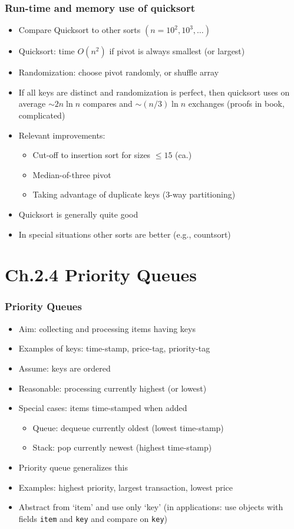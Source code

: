 \documentclass[handout]{beamer}
\begin{document}
\begin{frame}
    \frametitle{Run-time and memory use of quicksort}

\begin{itemize}[<+->]
\item Compare Quicksort to other sorts $(n=10^2, 10^3,\ldots)$
\item Quicksort: time $O(n^2)$ if pivot is always smallest (or largest)
\item Randomization: choose pivot randomly, or shuffle array
\item If all keys are distinct and randomization is perfect, then quicksort
uses on average $\sim 2n\ln n$ compares and $\sim (n/3) \ln n$
exchanges (proofs in book, complicated)
\item Relevant improvements:
  \begin{itemize}[<+->]
  \item Cut-off to insertion sort for sizes $\leq 15$ (ca.)
  \item Median-of-three pivot
  \item Taking advantage of duplicate keys (3-way partitioning)
  \end{itemize}
\item Quicksort is generally quite good
\item In special situations other sorts are better (e.g., countsort)
\end{itemize}
\end{frame}

\section{Ch.2.4 Priority Queues}

\begin{frame}
    \frametitle{Priority Queues}

\begin{itemize}[<+->]
\item Aim: collecting and processing items having keys
\item Examples of keys: time-stamp, price-tag, priority-tag
\item Assume: keys are ordered
\item Reasonable: processing currently highest (or lowest)
\item Special cases: items time-stamped when added
  \begin{itemize}[<+->]
  \item Queue: dequeue currently oldest (lowest time-stamp)
  \item Stack: pop currently newest (highest time-stamp)
  \end{itemize}
\item Priority queue generalizes this
\item Examples: highest priority, largest transaction, lowest price
\item Abstract from `item' and use only `key' (in applications:
use objects with fields {\tt item} and {\tt key}
and compare on {\tt key})
\end{itemize}
\end{frame}
\end{document}
